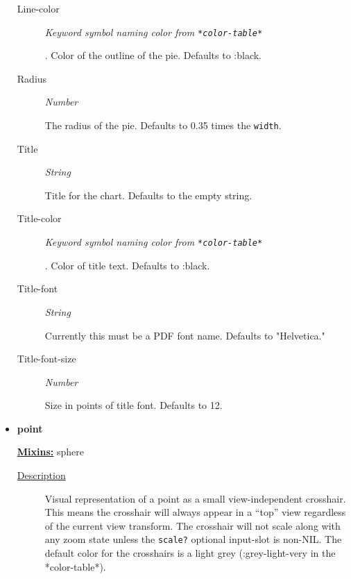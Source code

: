 \documentclass [11pt]{book}
\begin{document}
\begin{itemize}
\begin{description}
\item [Line-color]
\emph{Keyword symbol naming color from \texttt{*color-table*}}

.
Color of the outline of the pie. Defaults to :black.




\item [Radius]
\emph{Number}

 The radius of the pie. Defaults to 0.35 times the \texttt{width}.




\item [Title]
\emph{String}

 Title for the chart. Defaults to the empty string.




\item [Title-color]
\emph{Keyword symbol naming color from \texttt{*color-table*}}

.
Color of title text. Defaults to :black.




\item [Title-font]
\emph{String}

 Currently this must be a PDF font name. Defaults to "Helvetica."




\item [Title-font-size]
\emph{Number}

 Size in points of title font. Defaults to 12.




\end{description}







\item {}
\label{prim:point}
\textbf{point}


\textbf{
\underline{Mixins:}} sphere





\begin{description}

\item [
\underline{Description}]


Visual representation of a point as a small view-independent crosshair. This means
the crosshair will always appear in a ``top'' view regardless of the current view transform. The crosshair will
not scale along with any zoom state unless the \texttt{scale?} optional input-slot is non-NIL. The default
color for the crosshairs is a light grey (:grey-light-very in the *color-table*).




\end{description}
\end{itemize}
\end{document}
